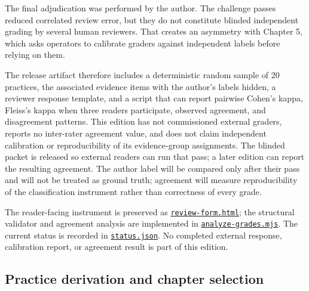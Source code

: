 The final adjudication was performed by the author. The challenge passes reduced correlated review error, but they do not constitute blinded independent grading by several human reviewers. That creates an asymmetry with Chapter 5, which asks operators to calibrate graders against independent labels before relying on them.

The release artifact therefore includes a deterministic random sample of 20 practices, the associated evidence items with the author's labels hidden, a reviewer response template, and a script that can report pairwise Cohen's kappa, Fleiss's kappa when three readers participate, observed agreement, and disagreement patterns. This edition has not commissioned external graders, reports no inter-rater agreement value, and does not claim independent calibration or reproducibility of its evidence-group assignments. The blinded packet is released so external readers can run that pass; a later edition can report the resulting agreement. The author label will be compared only after their pass and will not be treated as ground truth; agreement will measure reproducibility of the classification instrument rather than correctness of every grade.

The reader-facing instrument is preserved as \href{https://github.com/sjarmak/engineering-reliable-coding-agents/blob/main/companion/methodology/external-grading/review-form.html}{\texttt{review-form.html}}; the structural validator and agreement analysis are implemented in \href{https://github.com/sjarmak/engineering-reliable-coding-agents/blob/main/companion/methodology/external-grading/analyze-grades.mjs}{\texttt{analyze-grades.mjs}}. The current status is recorded in \href{https://github.com/sjarmak/engineering-reliable-coding-agents/blob/main/companion/methodology/external-grading/status.json}{\texttt{status.json}}. No completed external response, calibration report, or agreement result is part of this edition.

\hypertarget{practice-derivation-and-chapter-selection}{%
\subsection{Practice derivation and chapter selection}\label{practice-derivation-and-chapter-selection}}

